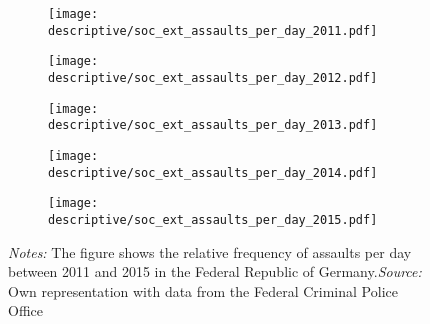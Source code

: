 \documentclass[11pt, a4paper, draft]{article} %
\begin{document}
\vspace*{\fill}
\begin{figure}[H]\centering
	\caption{Distribution of assaults across days of the year, per year}\label{fig_soc_ext:assault_year_distribution}
	\begin{subfigure}[h]{0.48\linewidth}\centering
		\texttt{[image: descriptive/soc\_ext\_assaults\_per\_day\_2011.pdf]}
	\end{subfigure}
	\begin{subfigure}[h]{0.48\linewidth}\centering
		\texttt{[image: descriptive/soc\_ext\_assaults\_per\_day\_2012.pdf]}
	\end{subfigure}\begin{subfigure}[h]{0.48\linewidth}\centering
		\texttt{[image: descriptive/soc\_ext\_assaults\_per\_day\_2013.pdf]}
	\end{subfigure}
	\begin{subfigure}[h]{0.48\linewidth}\centering
		\texttt{[image: descriptive/soc\_ext\_assaults\_per\_day\_2014.pdf]}
	\end{subfigure}
	\begin{subfigure}[h]{0.48\linewidth}\centering
		\texttt{[image: descriptive/soc\_ext\_assaults\_per\_day\_2015.pdf]}
	\end{subfigure}
	\begin{minipage}{\linewidth}
		\scriptsize{\emph{Notes:} The figure shows the relative frequency of assaults per day between 2011 and 2015 in the Federal Republic of Germany.\newline \emph{Source:} Own representation with data from the Federal Criminal Police Office}
	\end{minipage}
\end{figure}
\vspace*{\fill}\clearpage
\end{document}

